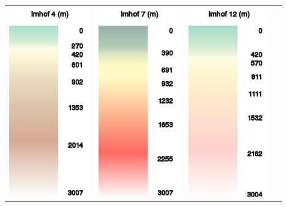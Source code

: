 \begin{maxipage}
\begin{longtable}{c c c c}
\includegraphics[angle=0,width=3.5cm,keepaspectratio='true']{figures/ramp-terrain-imhof4.png}&
\includegraphics[angle=0,width=3.5cm,keepaspectratio='true']{figures/ramp-terrain-imhof7.png}&
\includegraphics[angle=0,width=3.5cm,keepaspectratio='true']{figures/ramp-terrain-imhof12.png}&

\end{longtable}
\end{maxipage}
